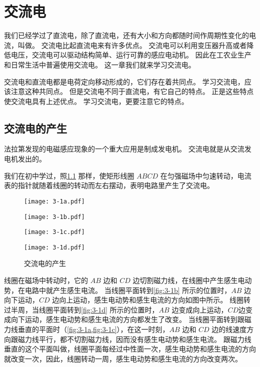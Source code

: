\chapter{交流电}
我们已经学过了直流电，除了直流电，还有大小和方向都随时间作周期性变化的电流，叫做。
交流电比起直流电来有许多优点。
交流电可以利用变压器升高或者降低电压，交流电可以驱动结构简单、运行可靠的感应电动机。
因此在工农业生产和日常生活中普遍使用交流电。
这一章我们就来学习交流电。

交流电和直流电都是电荷定向移动形成的，它们存在着共同点。
学习交流电，应该注意这种共同点。
但是交流电不同于直流电，有它自己的特点。
正是这些特点使交流电具有上述优点。
学习交流电，更要注意它的特点。

\section{交流电的产生}
法拉第发现的电磁感应现象的一个重大应用是制成发电机。
交流电就是从交流发电机发出的。

我们在初中学过，照\cref{fig:3-1} 那样，使矩形线圈 $ABCD$ 在匀强磁场中匀速转动，电流表的指针就随着线圈的转动而左右摆动，表明电路里产生了交流电。

\begin{figure}
  \begin{minipage}[b]{0.45\linewidth}\centering
    \texttt{[image: 3-1a.pdf]}
    \subcaption{}\label{fig:3-1a}
  \end{minipage}%
  \begin{minipage}[b]{0.45\linewidth}\centering
    \texttt{[image: 3-1b.pdf]}
    \subcaption{}\label{fig:3-1b}
  \end{minipage}
  \begin{minipage}[b]{0.45\linewidth}\centering
    \texttt{[image: 3-1c.pdf]}
    \subcaption{}\label{fig:3-1c}
  \end{minipage}%
  \begin{minipage}[b]{0.45\linewidth}\centering
    \texttt{[image: 3-1d.pdf]}
    \subcaption{}\label{fig:3-1d}
  \end{minipage}
  \caption{交流电的产生}\label{fig:3-1}
\end{figure}

线圈在磁场中转动时，它的 $AB$ 边和 $CD$ 边切割磁力线，在线圈中产生感生电动势，在电路中就产生感生电流。
当线圈平面转到\cref{fig:3-1b} 所示的位置时，$AB$ 边向下运动，$CD$ 边向上运动，感生电动势和感生电流的方向如图中所示。
线圈转过半周，当线圈平面转到\cref{fig:3-1d} 所示的位置时，$AB$ 边变成向上运动，$CD $边变成向下运动，感生电动势和感生电流的方向都发生了改变。
当线圈平面转到跟磁力线垂直的平面时（\cref{fig:3-1a,fig:3-1c}），在这一时刻，$AB$ 边和 $CD$ 边的线速度方向跟磁力线平行，都不切割磁力线，因而没有感生电动势和感生电流。
跟磁力线垂直的这个平面叫做，线圈平面每经过中性面一次，感生电动势和感生电流的方向就改变一次，因此，线圈转动一周，感生电动势和感生电流的方向改变两次。


